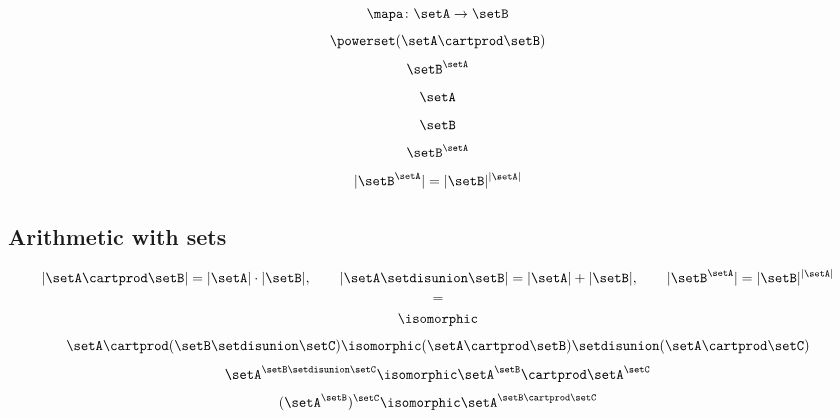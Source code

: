 \begin{forslides}
    \begin{equation}\label{eq:slides_session2_156}
        \mapa \colon \setA \to \setB
    \end{equation}
    \begin{equation}\label{eq:slides_session2_157}
        \powerset (\setA \cartprod \setB)
    \end{equation}
    \begin{equation}\label{eq:slides_session2_158}
        \setB^{\setA}
    \end{equation}
    \begin{equation}\label{eq:slides_session2_159}
        \setA
    \end{equation}
    \begin{equation}\label{eq:slides_session2_160}
        \setB
    \end{equation}
    \begin{equation}\label{eq:slides_session2_161}
        \setB^{\setA}
    \end{equation}
    \begin{equation}\label{eq:slides_session2_162}
        \vert \setB^{\setA} \vert = \vert \setB \vert^{\vert \setA \vert}
    \end{equation}

    \subsection{Arithmetic with sets}

    \begin{equation}\label{eq:slides_session2_163}
        \vert \setA \cartprod \setB \vert = \vert \setA \vert \cdot \vert \setB \vert, \qquad \vert \setA \setdisunion \setB \vert = \vert \setA \vert + \vert \setB \vert, \qquad \vert \setB^{\setA} \vert = \vert \setB \vert^{\vert \setA \vert}
    \end{equation}
    \begin{equation}\label{eq:slides_session2_164}
        =
    \end{equation}
    \begin{equation}\label{eq:slides_session2_165}
        \isomorphic
    \end{equation}
    \begin{equation}\label{eq:slides_session2_166}
        \setA \cartprod (\setB \setdisunion \setC)  \isomorphic (\setA \cartprod \setB) \setdisunion (\setA \cartprod \setC)
    \end{equation}
    \begin{equation}\label{eq:slides_session2_167}
        \setA^{\setB \setdisunion \setC} \isomorphic \setA^\setB \cartprod \setA^\setC
    \end{equation}
    \begin{equation}\label{eq:slides_session2_168}
        (\setA^\setB)^\setC  \isomorphic \setA^{\setB \cartprod \setC}
    \end{equation}


\end{forslides}
